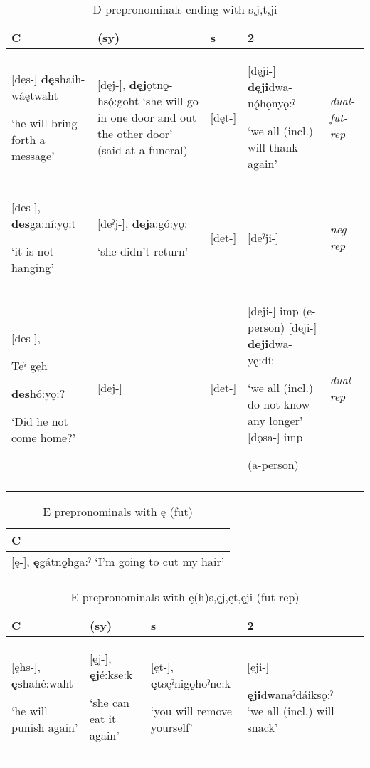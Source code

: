 
\begin{table}
\caption{D prepronominals ending with s,j,t,ji}
\label{tab:1:dualfutnegrep}
\scriptsize{
\begin{tabularx}{\textwidth}{XXXXX}
\lsptoprule
C & (sy) & s & 2 & \\
\midrule
{}[dęs-] \textbf{dęs}haih-wáętwaht 

‘he will bring forth a message’ & [dęj-], \textbf{dęj}ǫtnǫ̱-hsǫ́:goht
‘she will go in one door and out the other door’ (said at a funeral) & [dęt-] & [dęji-] \textbf{dęji}dwa-nǫ́hǫnyǫ:ˀ 

‘we all (incl.) will thank again’ & {\itshape dual-fut-rep}\\
\midrule
{}[des-], \textbf{des}ga:ní:yǫ:t 

‘it is not hanging’ & [deˀj-], \textbf{dej}a:gó:yǫ: 

‘she didn’t return’ & [det-] & [deˀji-] & {\itshape neg-rep}\\
\midrule
{}[des-], 

Tęˀ gęh 

\textbf{des}hó:yǫ:? 

‘Did he not come home?’ & [dej-] & [det-] & [deji-] imp (e-person) [deji-] \textbf{deji}dwa-yę:dí: 

‘we all (incl.) do not know any longer’ [dǫsa-] imp 

(a-person) & {\itshape dual-rep}\\
\lspbottomrule
\end{tabularx}}
\end{table}



\begin{table}
\caption{E prepronominals with ę (fut)}
\label{tab:1:eprepronfut}
\scriptsize{
\begin{tabularx}{\textwidth}{X}
\lsptoprule
C \\
\midrule
{}[ę-], \textbf{ę}gátnǫ̱hga:ˀ ‘I’m going to cut my hair’ \\
\lspbottomrule
\end{tabularx}}
\end{table}



\begin{table}
\caption{E prepronominals with ę(h)s,ęj,ęt,ęji (fut-rep)}
\label{tab:1:eprepronfutrep}
\scriptsize{
\begin{tabularx}{\textwidth}{XXXXX}
\lsptoprule
C & (sy) & s & 2 \\
\midrule
{}[ęhs-], \textbf{ęs}hahé:waht 

‘he will punish again’ & [ęj-], \textbf{ęj}é:kse:k 

‘she can eat it again’ & [ęt-], \textbf{ęt}sęˀnigǫhoˀne:k 

‘you will remove yourself’ & [ęji-] 

\textbf{ęji}dwanaˀdáiksǫ:ˀ ‘we all (incl.) will snack’\\
\lspbottomrule
\end{tabularx}}
\end{table}

